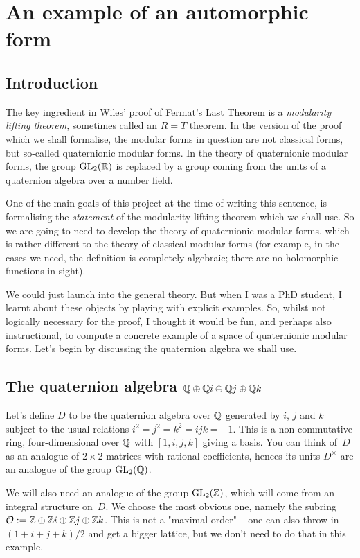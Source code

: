 \chapter{An example of an automorphic form}

\section{Introduction}

The key ingredient in Wiles' proof of Fermat's Last Theorem is a \emph{modularity lifting theorem},
sometimes called an $R=T$ theorem. In the version of the proof which we shall formalise,
the modular forms in question are not classical forms, but so-called quaternionic modular forms.
In the theory of quaternionic modular forms, the group $\operatorname{GL}_2(\mathbb{R})$ is replaced by a group coming 
from the units of a quaternion algebra over a number field.

One of the main goals of this project at the time of writing this sentence, is formalising
the \emph{statement} of the modularity lifting theorem which we shall use. So we are going
to need to develop the theory of quaternionic modular forms, which is rather different
to the theory of classical modular forms (for example, in the cases we need, the definition 
is completely algebraic; there are no holomorphic functions in sight).

We could just launch into the general theory. But when I was a PhD student, I learnt about
these objects by playing with explicit examples. So, whilst not logically necessary for the proof,
I thought it would be fun, and perhaps also instructional, to compute a concrete example of a space 
of quaternionic modular forms. Let's begin by discussing the quaternion algebra we shall use.

\section{The quaternion algebra $\mathbb{Q}\oplus\mathbb{Q} i\oplus\mathbb{Q} j\oplus\mathbb{Q} k$}

Let's define $D$ to be the quaternion algebra over $\mathbb{Q}$ generated by $i$, $j$ and $k$ subject to 
the usual relations $i^2=j^2=k^2=ijk=-1$. This is a non-commutative ring, four-dimensional
over $\mathbb{Q}$ with $[1,i,j,k]$ giving a basis. You can think of~$D$ as an analogue of $2\times 2$ 
matrices with rational coefficients, hences its units $D^\times$ are an analogue of the
group $\operatorname{GL}_2(\mathbb{Q})$.

We will also need an analogue of the group $\operatorname{GL}_2(\mathbb{Z})$, which will come from an integral structure
on~$D$. We choose the most obvious one, namely the subring $\mathcal{O}:=\mathbb{Z}\oplus\mathbb{Z} i\oplus\mathbb{Z} j\oplus\mathbb{Z} k$.
This is not a "maximal order" -- one can also throw in $(1+i+j+k)/2$ and get a bigger lattice, 
but we don't need to do that in this example.

